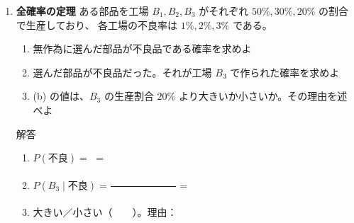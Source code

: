 \documentclass[a4paper,dvipdfmx]{jsarticle}
\newcommand{\提出期限}{2026年11月9日（月）}
\newcommand{\学籍番号}{0000000}
\newcommand{\氏名}{氏名を書く}
\newcommand{\提出日}{2026年11月9日}
\newenvironment{answer}{\begin{itembox}[l]{解答}}{\end{itembox}}
\begin{document}
\begin{enumerate}
\begin{answer}
\begin{enumerate}
          理由：
          \vspace{10mm}
        \item 逐次更新：事前確率 $= $ \phantom{XXXX} として
          \begin{equation*}
            P(\text{病気} \mid \text{陽性2回}) = \phantom{XXXXXXXXXXXXXXXXXXXXXXXX} \approx \phantom{XXXX}
          \end{equation*}
          一度に計算：
          \begin{equation*}
            P(\text{病気} \mid \text{陽性2回}) = \frac{0.98^2 \times \phantom{XXXX}}{0.98^2 \times \phantom{XXXX} + 0.02^2 \times \phantom{XXXX}} \approx \phantom{XXXX}
          \end{equation*}
        \item 事前オッズ $= $ \phantom{XXXXXX}、尤度比 $= $ \phantom{XXXX}、
          (a) の事後オッズ $= $ \phantom{XXXXXX} $\to$ 確率 \phantom{XXXX}、
          (c) の事後オッズ $= $ \phantom{XXXXXX} $\to$ 確率 \phantom{XXXX}
          \vspace{4mm}
      \end{enumerate}
    \end{answer}

  \item \textbf{全確率の定理}\quad
    ある部品を工場 $B_1, B_2, B_3$ がそれぞれ $50\%, 30\%, 20\%$ の割合で生産しており、
    各工場の不良率は $1\%, 2\%, 3\%$ である。
    \begin{enumerate}
      \item 無作為に選んだ部品が不良品である確率を求めよ
      \item 選んだ部品が不良品だった。それが工場 $B_3$ で作られた確率を求めよ
      \item (b) の値は、$B_3$ の生産割合 $20\%$ より大きいか小さいか。その理由を述べよ
    \end{enumerate}
    \begin{answer}
      \begin{enumerate}
        \item $P(\text{不良}) = $ \phantom{XXXXXXXXXXXXXXXXXXXXXXXX} $= $ \phantom{XXXX}
          \vspace{4mm}
        \item $P(B_3 \mid \text{不良}) = \dfrac{\phantom{XXXXXXXX}}{\phantom{XXXXXXXX}} = $ \phantom{XXXX}
          \vspace{4mm}
        \item 大きい／小さい（　　）。理由：
          \vspace{10mm}
      \end{enumerate}
    \end{answer}


\end{enumerate}
\end{document}
